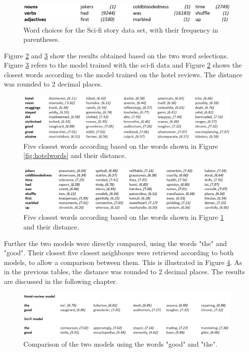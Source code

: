 \documentclass[fleqn,10pt]{SelfArx} %
\begin{document}
\begin{figure}[ht]\centering
	\includegraphics[width=\linewidth]{Figures/scifi_words.png}
	\caption{Word choices for the Sci-fi story data set, with their frequency in parentheses.}
	\label{fig:scifiwords}
\end{figure}

\noindent Figure \ref{fig:hotel_results} and \ref{fig:scifi_results} show the results obtained based on the two word selections. Figure \ref{fig:scifi_results} refers to the model trained with the sci-fi data and Figure \ref{fig:hotel_results} shows the closest words according to the model trained on the hotel reviews. The distance was rounded to 2 decimal places.

\begin{figure}[ht]\centering
	\includegraphics[width=\linewidth]{Figures/hotel_results.png}
	\caption{Five closest words according based on the words shown in Figure \ref{fig:hotelwords} and their distance.}
	\label{fig:hotel_results}
\end{figure}

\begin{figure}[ht]\centering
	\includegraphics[width=\linewidth]{Figures/scifi_results.png}
	\caption{Five closest words according based on the words shown in Figure \ref{fig:scifiwords} and their distance.}
	\label{fig:scifi_results}
\end{figure}
\noindent Further the two models were directly compared, using the words "the" and "good". Their closest five closest neighbours were retrieved according to both models, to allow a comparison between them. This is illustrated in Figure \ref{fig:comparison}. As in the previous tables, the distance was rounded to 2 decimal places. The results are discussed in the following chapter.
\begin{figure}[ht]\centering
	\includegraphics[width=\linewidth]{Figures/comparison.png}
	\caption{Comparison of the two models using the words "good" and "the".}
	\label{fig:comparison}
\end{figure}
\end{document}
